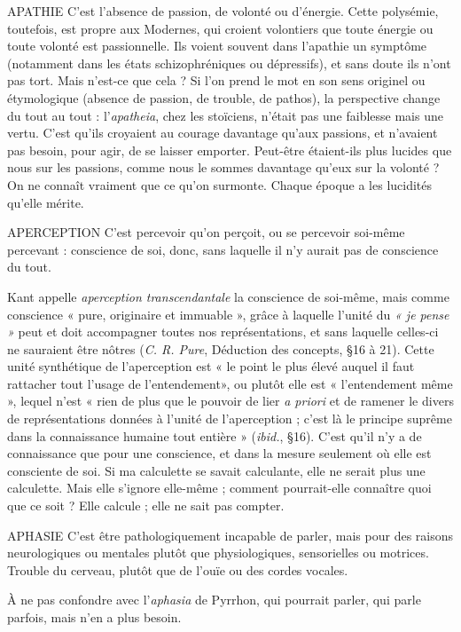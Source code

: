 APATHIE C'est l'absence de passion, de volonté ou d’énergie. Cette polysémie,
toutefois, est propre aux Modernes, qui croient volontiers
que toute énergie ou toute volonté est passionnelle. Ils voient souvent dans
l’apathie un symptôme (notamment dans les états schizophréniques ou dépressifs),
et sans doute ils n’ont pas tort. Mais n’est-ce que cela ? Si l’on prend le
mot en son sens originel ou étymologique (absence de passion, de trouble, de
pathos), la perspective change du tout au tout : l’{\it apatheia}, chez les stoïciens,
n'était pas une faiblesse mais une vertu. C’est qu’ils croyaient au courage
davantage qu'aux passions, et n’avaient pas besoin, pour agir, de se laisser
emporter. Peut-être étaient-ils plus lucides que nous sur les passions, comme
nous le sommes davantage qu’eux sur la volonté ? On ne connaît vraiment que
ce qu'on surmonte. Chaque époque a les lucidités qu’elle mérite.

APERCEPTION C'est percevoir qu’on perçoit, ou se percevoir soi-même
percevant : conscience de soi, donc, sans laquelle il n’y
aurait pas de conscience du tout.

Kant appelle {\it aperception transcendantale} la conscience de soi-même, mais
comme conscience « pure, originaire et immuable », grâce à laquelle l'unité du
{\it « je pense »} peut et doit accompagner toutes nos représentations, et sans laquelle
celles-ci ne sauraient être nôtres ({\it C. R. Pure}, Déduction des concepts, \S 16 à
21). Cette unité synthétique de l’aperception est « le point le plus élevé auquel
il faut rattacher tout l’usage de l’entendement», ou plutôt elle est
« l’entendement même », lequel n’est « rien de plus que le pouvoir de lier {\it a
priori} et de ramener le divers de représentations données à l’unité de
l’aperception ; c’est là le principe suprême dans la connaissance humaine tout
entière » ({\it ibid.}, \S 16). C’est qu’il n’y a de connaissance que pour une conscience,
et dans la mesure seulement où elle est consciente de soi. Si ma calculette
se savait calculante, elle ne serait plus une calculette. Mais elle s’ignore
elle-même ; comment pourrait-elle connaître quoi que ce soit ? Elle calcule ;
elle ne sait pas compter.

APHASIE C’est être pathologiquement incapable de parler, mais pour des
raisons neurologiques ou mentales plutôt que physiologiques,
sensorielles ou motrices. Trouble du cerveau, plutôt que de l’ouïe ou des cordes
vocales.

À ne pas confondre avec l’{\it aphasia} de Pyrrhon, qui pourrait parler, qui parle
parfois, mais n’en a plus besoin.

